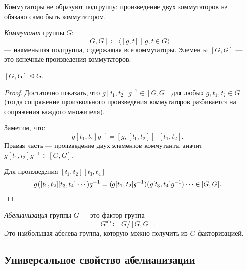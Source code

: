 \begin{remark}
    Коммутаторы не образуют подгруппу: произведение двух коммутаторов не обязано само быть коммутатором.
\end{remark}

\begin{definition}
    \emph{Коммутант} группы $G$:
    \[
        [G, G] \coloneqq \langle [g, t] \mid g, t \in G \rangle
    \]
    --- наименьшая подгруппа, содержащая все коммутаторы. Элементы $[G, G]$ --- это конечные произведения коммутаторов.
\end{definition}

\begin{stmt}
    $[G, G] \trianglelefteq G$.

    \begin{proof}
        Достаточно показать, что $g [t_1, t_2] g^{-1} \in [G, G]$ для любых $g, t_1, t_2 \in G$ (тогда сопряжение произвольного произведения коммутаторов разбивается на сопряжения каждого множителя).

        Заметим, что:
        \[
            g [t_1, t_2] g^{-1} = [g, [t_1, t_2]] \cdot [t_1, t_2].
        \]
        Правая часть --- произведение двух элементов коммутанта, значит $g[t_1, t_2]g^{-1} \in [G,G]$.

        Для произведения $[t_1, t_2][t_3, t_4] \cdots$:
        \[
            g \bigl([t_1,t_2][t_3,t_4]\cdots\bigr) g^{-1}
            = (g[t_1,t_2]g^{-1})(g[t_3,t_4]g^{-1})\cdots \in [G, G]. \qedhere
        \]
    \end{proof}
\end{stmt}

\begin{definition}
    \emph{Абелианизация} группы $G$ --- это фактор-группа
    \[
        G^{\mathrm{ab}} \coloneqq G / [G, G].
    \]
    Это наибольшая абелева группа, которую можно получить из $G$ факторизацией.
\end{definition}

\subsection*{Универсальное свойство абелианизации}

